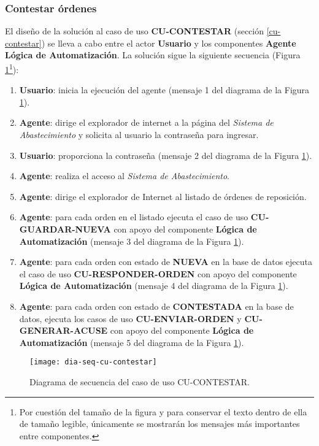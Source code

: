 \subsubsection{Contestar órdenes}
El diseño de la solución al caso de uso \textbf{CU-CONTESTAR} (sección \ref{cu-contestar}) se lleva a cabo entre el actor \textbf{Usuario} y los componentes \textbf{Agente} \textbf{Lógica de Automatización}. La solución sigue la siguiente secuencia (Figura \ref{fig:dia-seq-cu-contestar}\footnote{Por cuestión del tamaño de la figura y para conservar el texto dentro de ella de tamaño legible, únicamente se mostrarán los mensajes más importantes entre componentes.}):
\begin{enumerate}
	\item \textbf{Usuario}: inicia la ejecución del agente (mensaje 1 del diagrama de la Figura \ref{fig:dia-seq-cu-contestar}).
	\item \textbf{Agente}: dirige el explorador de internet a la página del \textit{Sistema de Abastecimiento} y solicita al usuario la contraseña para ingresar.
	\item \textbf{Usuario}: proporciona la contraseña (mensaje 2 del diagrama de la Figura \ref{fig:dia-seq-cu-contestar}).
	\item \textbf{Agente}: realiza el acceso al \textit{Sistema de Abastecimiento}.
	\item \textbf{Agente}: dirige el explorador de Internet al listado de órdenes de reposición.
	\item \textbf{Agente}: para cada orden en el listado ejecuta el caso de uso \textbf{CU-GUARDAR-NUEVA} con apoyo del componente \textbf{Lógica de Automatización} (mensaje 3 del diagrama de la Figura \ref{fig:dia-seq-cu-contestar}).
	\item \textbf{Agente}: para cada orden con estado de \textbf{NUEVA} en la base de datos ejecuta el caso de uso \textbf{CU-RESPONDER-ORDEN} con apoyo del componente \textbf{Lógica de Automatización} (mensaje 4 del diagrama de la Figura \ref{fig:dia-seq-cu-contestar}).
	\item \textbf{Agente}: para cada orden con estado de \textbf{CONTESTADA} en la base de datos, ejecuta los casos de uso \textbf{CU-ENVIAR-ORDEN} y \textbf{CU-GENERAR-ACUSE} con apoyo del componente \textbf{Lógica de Automatización} (mensaje 5 del diagrama de la Figura \ref{fig:dia-seq-cu-contestar}).
\end{enumerate}
\begin{figure}[h]
	\centering
	\texttt{[image: dia-seq-cu-contestar]}
	\caption{Diagrama de secuencia del caso de uso CU-CONTESTAR.}
	\label{fig:dia-seq-cu-contestar}
\end{figure}
